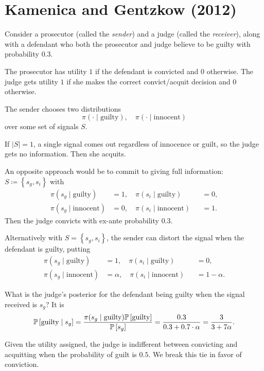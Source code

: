 
\section{Kamenica and Gentzkow (2012)}

Consider a prosecutor (called the \emph{sender}) and a judge (called the \emph{receiver}), along with a defendant who both the prosecutor and judge believe to be guilty with probability $0.3$.

The prosecutor has utility $1$ if the defendant is convicted and $0$ otherwise.
The judge gets utility $1$ if she makes the correct convict/acquit decision and $0$ otherwise.

The sender chooses two distributions 
\[
	\pi(\cdot \mid \text{guilty}), \quad \pi(\cdot \mid \text{innocent})
\] over some set of signals $S$.

If $\left| S \right| = 1$, a single signal comes out regardless of innocence or guilt, so the judge gets no information. Then she acquits.

An opposite approach would be to commit to giving full information: $S \coloneqq  \left\{s_g,s_i\right\}$  with 
\begin{align*}
	\pi(s_g \mid \text{guilty}) &= 1, \quad \pi(s_i \mid \text{guilty}) &&= 0, \\
	\pi(s_g \mid \text{innocent}) &= 0, \quad \pi(s_i \mid \text{innocent}) &&= 1
.\end{align*}
Then the judge convicts with ex-ante probability $0.3$.

Alternatively with $S = \left\{s_g,s_i\right\}$, the sender can distort the signal when the defendant is guilty, putting
\begin{align*}
	\pi(s_g \mid \text{guilty}) &= 1, \quad \pi(s_i \mid \text{guilty}) &&= 0, \\
	\pi(s_g \mid \text{innocent}) &= \alpha, \quad \pi(s_i \mid \text{innocent}) &&= 1-\alpha
.\end{align*}

What is the judge's posterior for the defendant being guilty when the signal received is $s_g$? It is \[
	\P\left[\text{guilty} \mid s_g\right] = \frac{\pi(s_g \mid \text{guilty}) \P\left[\text{guilty}\right] }{\P\left[s_g\right] } = \frac{0.3}{0.3 + 0.7 \cdot \alpha} = \frac{3}{3+7\alpha}
.\] 
\begin{assumption}
	Given the utility assigned, the judge is indifferent between convicting and acquitting when the probability of guilt is $0.5$. We break this tie in favor of conviction.
\end{assumption}

